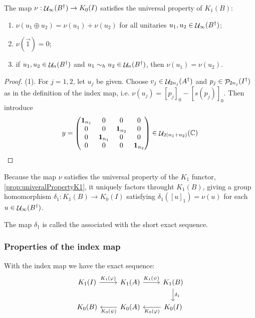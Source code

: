 \begin{lemma}
The map $\nu: \mathop{\mathcal{U}}\nolimits_\infty(B^\dagger)\to K_0(I)$ satisfies the universal property of $K_1(B)$:
\begin{enumerate}
\item $\nu(u_1\oplus u_2) = \nu(u_1)+\nu(u_2)$ for all unitaries $u_1,u_2\in\mathop{\mathcal{U}}\nolimits_\infty(B^\dagger)$;
\item $\nu(\vec{1}) = 0$;
\item if $u_1,u_2\in\mathop{\mathcal{U}}\nolimits_n(B^\dagger)$ and $u_1\sim_h u_2 \in \mathop{\mathcal{U}}\nolimits_n(B^\dagger)$, then $\nu(u_1) = \nu(u_2)$.
\end{enumerate}
\end{lemma}
\begin{proof}
(1). For $j=1,2$, let $u_j$ be given. Choose $v_j \in \mathop{\mathcal{U}}\nolimits_{2n_j}(A^\dagger)$ and $p_j \in \mathop{\mathcal{P}}\nolimits_{2n_j}(I^\dagger)$ as in the definition of the index map, i.e. $\nu(u_j) = [p_j]_0 - [s(p_j)]_0$. Then introduce
\[ y = \begin{pmatrix}
\bm{\mathrm{1}}_{n_1} & 0 & 0 & 0 \\
0 & 0 & \bm{\mathrm{1}}_{n_2} & 0 \\
0 & \bm{\mathrm{1}}_{n_1} & 0 & 0 \\
0 & 0 & 0 & \bm{\mathrm{1}}_{n_2}
\end{pmatrix}\in \mathop{\mathcal{U}}\nolimits_{2(n_1+n_2)}(\mathbb{C}) \]
\end{proof}

Because the map $\nu$ satisfies the universal property of the $K_1$ functor, \ref{prop:univeralPropertyK1}, it uniquely factors throught $K_1(B)$, giving a group homomorphism $\delta_1: K_1(B)\to K_0(I)$ satisfying $\delta_1([u]_1) = \nu(u)$ for each $u\in\mathop{\mathcal{U}}\nolimits_\infty(B^\dagger)$.

The map $\delta_1$ is called the  associated with the short exact sequence.

\subsubsection{Properties of the index map}
With the index map we have the exact sequence:
\[ \begin{tikzcd}
K_1(I) \rar{K_1(\varphi)} & K_1(A) \rar{K_1(\psi)} & K_1(B) \dar{\delta_1} \\
K_0(B) & K_0(A) \lar{K_0(\psi)} & K_0(I) \lar{K_0(\varphi)}
\end{tikzcd} \]

